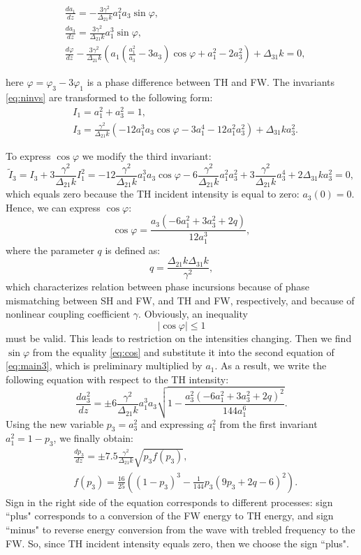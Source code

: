 \documentclass[a4paper, 12pt, onecolumn]{extarticle}
\begin{document}
\begin{equation}
\label{eq:main3}
\begin{aligned}
&\frac{da_1}{dz}=-\frac{3\gamma^2}{\Delta_{21}k}a_1^2a_3\sin\varphi,\\
&\frac{da_3}{dz}=\frac{3\gamma^2}{\Delta_{21}k}a_1^3\sin\varphi,\\
&\frac{d\varphi}{dz}-\frac{3 \gamma^2}{\Delta_{21}k}\left(a_1  \left(\frac{a_1^2}{a_3}-3a_3\right)\cos\varphi+a_1^2-2a_3^2\right)+\Delta_{31}k=0,
\end{aligned}
\end{equation}

here \(\varphi=\varphi_3-3\varphi_1\) is a phase difference between TH and FW. The invariants  \eqref{eq:ninvs} are transformed to the following form:
\[
\begin{aligned}
&I_1=a_1^2+a_3^2=1,\\
&I_3=\frac{\gamma^2}{\Delta_{21}k}\left(-12a_1^3a_3\cos\varphi-3a_1^4-12a_1^2a_3^2\right)+\Delta_{31}ka_3^2.
\end{aligned}
\] 

To express \(\cos \varphi\) we modify the third invariant:
\[
\tilde{I}_3=I_3+3\frac{\gamma^2}{\Delta_{21}k}I_1^2=-12\frac{\gamma^2}{\Delta_{21}k}a_1^3a_3\cos\varphi-6\frac{\gamma^2}{\Delta_{21}k}a_1^2a_3^2+3\frac{\gamma^2}{\Delta_{21}k}a_3^4+2\Delta_{31}ka_3^2=0,
\]
which equals zero because the TH incident intensity is equal to zero: \(a_3(0)=0\). Hence, we can express \(\cos \varphi\):
\begin{equation}
\label{eq:cos}
\cos\varphi=\frac{a_3(-6a_1^2+3a_3^2+2q)}{12a_1^3},
\end{equation}
where the parameter $q$ is defined as:
$$
q=\frac{\Delta_{21}k\Delta_{31}k}{\gamma^2},
$$
which characterizes relation between phase incursions because of phase mismatching between SH and FW, and TH and FW, respectively, and because of nonlinear coupling coefficient ${\gamma}$.
Obviously, an inequality 
\[
|\cos\varphi|\le1
\]
must be valid. This leads to restriction on the intensities changing.
Then we find \(\sin \varphi\) from the equality \eqref{eq:cos} and substitute it into the second equation of \eqref{eq:main3}, which is preliminary multiplied by \(a_1\). As a result, we write the following equation with respect to the TH intensity:
\[\frac{da_3^2}{dz}=\pm6\frac{\gamma^2}{\Delta_{21}k}a_1^3a_3\sqrt{1-\frac{a_3^2(-6a_1^2+3a_3^2+2q)^2}{144a_1^6}}.\]
Using the new variable \(p_3=a_3^2\) and expressing \(a_1^2\) from the first invariant \(a_1^2=1-p_3\), we finally obtain:
\begin{equation}
\label{eq:main4}
\begin{aligned}
&\frac{dp_3}{dz}=\pm7.5\frac{\gamma^2}{\Delta_{21}k}\sqrt{p_3f(p_3)},\\
&f(p_3)=\frac{16}{25}((1-p_3)^3-\frac{1}{144}p_3(9p_3+2q-6)^2).
\end{aligned}
\end{equation}
Sign in the right side of the equation corresponds to different processes: sign ``plus" corresponds to a conversion of the FW energy to TH energy, and sign ``minus" to reverse energy conversion from the wave with trebled frequency to the FW. So, since TH incident intensity equals zero, then we choose the sign ``plus".
\end{document}
